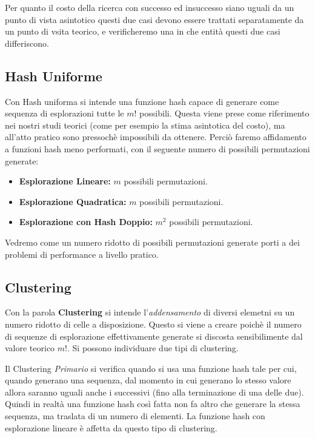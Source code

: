 \documentclass{article}
\begin{document}
Per quanto il costo della ricerca con successo ed insuccesso siano uguali da un punto di vista asintotico questi due casi devono essere trattati separatamente da un punto di vsita teorico, e verificheremo una in che entità questi due casi differiscono.

\subsection{Hash Uniforme}
\label{Hash_Uniforme}
Con Hash uniforma si intende una funzione hash capace di generare come sequenza di esplorazioni tutte le $m!$ possibili. Questa viene prese come riferimento nei nostri studi teorici (come per esempio la stima asintotica del costo), ma all'atto pratico sono pressochè impossibili da ottenere. Perciò faremo affidamento a funzioni hash meno performati, con il seguente numero di possibili permutazioni generate:
\begin{itemize}
\item \textbf{Esplorazione Lineare:} $m$ possibili permutazioni.
\item \textbf{Esplorazione Quadratica:} $m$ possibili permutazioni.
\item \textbf{Esplorazione con Hash Doppio:} $m^2$ possibili permutazioni.
\end{itemize} 

Vedremo come un numero ridotto di possibili permutazioni generate porti a dei problemi di performance a livello pratico.

\subsection{Clustering}
Con la parola \textbf{Clustering} si intende l'\emph{addensamento} di diversi elemetni su un numero ridotto di celle a disposizione. Questo si viene a creare poichè il numero di sequenze di esplorazione effettivamente generate si discosta sensibilimente dal valore teorico $m!$. Si possono individuare due tipi di clustering.

Il Clustering \emph{Primario} si verifica quando si usa una funzione hash tale per cui, quando generano una sequenza, dal momento in cui generano lo stesso valore allora saranno uguali anche i successivi (fino alla terminazione di una delle due). Quindi in realtà una funzione hash così fatta non fa altro che generare la stessa sequenza, ma traslata di un numero di elementi. La funzione hash con esplorazione lineare è affetta da questo tipo di clustering.
\end{document}

